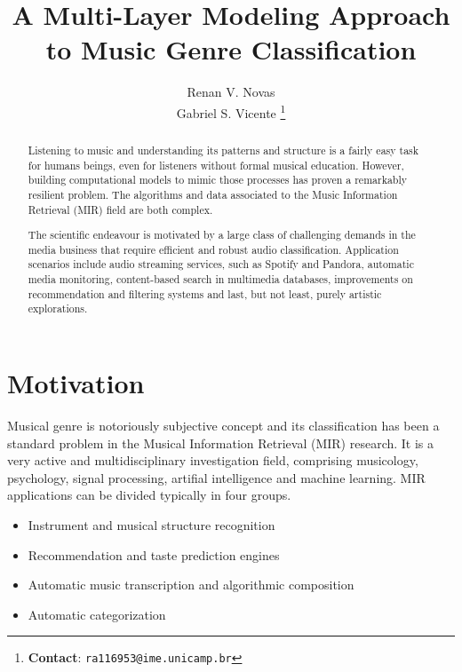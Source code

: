 \documentclass[10pt,twocolumn,letterpaper]{article}
\begin{document}
\title{A Multi-Layer Modeling Approach to Music Genre Classification}
\author{Renan V. Novas
		\\
		Gabriel S. Vicente
		\thanks{\textbf{Contact}: \tt\small{ra116953@ime.unicamp.br}} }

\maketitle
\begin{abstract}
Listening to music and understanding its patterns and structure is
a fairly easy task for humans beings, even for listeners without formal musical education.
However, building computational models to mimic those processes has proven a
remarkably resilient problem. The algorithms and data associated to the Music
Information Retrieval (MIR) field are both complex.

The scientific endeavour is motivated by a large class of challenging demands in
the media business that require efficient and robust audio classification.
Application scenarios include audio streaming services, such as Spotify and
Pandora, automatic media monitoring, content-based search in multimedia
databases, improvements on recommendation and filtering systems and last, but
not least, purely artistic explorations.
\end{abstract}
\section{Motivation}

Musical genre is notoriously subjective concept and its classification has been
a standard problem in the Musical Information Retrieval (MIR) research. It is
a very active and multidisciplinary investigation field, comprising musicology,
psychology, signal processing, artifial intelligence and machine learning. MIR
applications can be divided typically in four groups.

\begin{itemize}
  \item Instrument and musical structure recognition
  \item Recommendation and taste prediction engines
  \item Automatic music transcription and algorithmic composition 
  \item Automatic categorization
\end{itemize}
\end{document}
